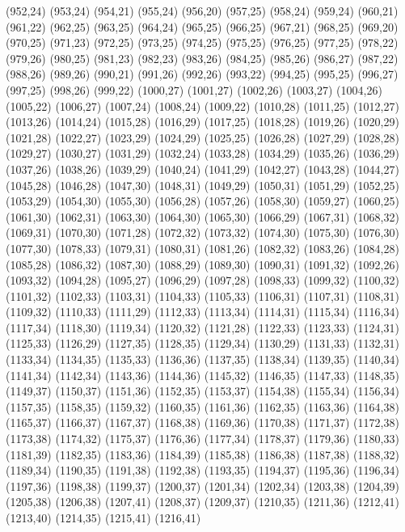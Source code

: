 (952,24)
(953,24)
(954,21)
(955,24)
(956,20)
(957,25)
(958,24)
(959,24)
(960,21)
(961,22)
(962,25)
(963,25)
(964,24)
(965,25)
(966,25)
(967,21)
(968,25)
(969,20)
(970,25)
(971,23)
(972,25)
(973,25)
(974,25)
(975,25)
(976,25)
(977,25)
(978,22)
(979,26)
(980,25)
(981,23)
(982,23)
(983,26)
(984,25)
(985,26)
(986,27)
(987,22)
(988,26)
(989,26)
(990,21)
(991,26)
(992,26)
(993,22)
(994,25)
(995,25)
(996,27)
(997,25)
(998,26)
(999,22)
(1000,27)
(1001,27)
(1002,26)
(1003,27)
(1004,26)
(1005,22)
(1006,27)
(1007,24)
(1008,24)
(1009,22)
(1010,28)
(1011,25)
(1012,27)
(1013,26)
(1014,24)
(1015,28)
(1016,29)
(1017,25)
(1018,28)
(1019,26)
(1020,29)
(1021,28)
(1022,27)
(1023,29)
(1024,29)
(1025,25)
(1026,28)
(1027,29)
(1028,28)
(1029,27)
(1030,27)
(1031,29)
(1032,24)
(1033,28)
(1034,29)
(1035,26)
(1036,29)
(1037,26)
(1038,26)
(1039,29)
(1040,24)
(1041,29)
(1042,27)
(1043,28)
(1044,27)
(1045,28)
(1046,28)
(1047,30)
(1048,31)
(1049,29)
(1050,31)
(1051,29)
(1052,25)
(1053,29)
(1054,30)
(1055,30)
(1056,28)
(1057,26)
(1058,30)
(1059,27)
(1060,25)
(1061,30)
(1062,31)
(1063,30)
(1064,30)
(1065,30)
(1066,29)
(1067,31)
(1068,32)
(1069,31)
(1070,30)
(1071,28)
(1072,32)
(1073,32)
(1074,30)
(1075,30)
(1076,30)
(1077,30)
(1078,33)
(1079,31)
(1080,31)
(1081,26)
(1082,32)
(1083,26)
(1084,28)
(1085,28)
(1086,32)
(1087,30)
(1088,29)
(1089,30)
(1090,31)
(1091,32)
(1092,26)
(1093,32)
(1094,28)
(1095,27)
(1096,29)
(1097,28)
(1098,33)
(1099,32)
(1100,32)
(1101,32)
(1102,33)
(1103,31)
(1104,33)
(1105,33)
(1106,31)
(1107,31)
(1108,31)
(1109,32)
(1110,33)
(1111,29)
(1112,33)
(1113,34)
(1114,31)
(1115,34)
(1116,34)
(1117,34)
(1118,30)
(1119,34)
(1120,32)
(1121,28)
(1122,33)
(1123,33)
(1124,31)
(1125,33)
(1126,29)
(1127,35)
(1128,35)
(1129,34)
(1130,29)
(1131,33)
(1132,31)
(1133,34)
(1134,35)
(1135,33)
(1136,36)
(1137,35)
(1138,34)
(1139,35)
(1140,34)
(1141,34)
(1142,34)
(1143,36)
(1144,36)
(1145,32)
(1146,35)
(1147,33)
(1148,35)
(1149,37)
(1150,37)
(1151,36)
(1152,35)
(1153,37)
(1154,38)
(1155,34)
(1156,34)
(1157,35)
(1158,35)
(1159,32)
(1160,35)
(1161,36)
(1162,35)
(1163,36)
(1164,38)
(1165,37)
(1166,37)
(1167,37)
(1168,38)
(1169,36)
(1170,38)
(1171,37)
(1172,38)
(1173,38)
(1174,32)
(1175,37)
(1176,36)
(1177,34)
(1178,37)
(1179,36)
(1180,33)
(1181,39)
(1182,35)
(1183,36)
(1184,39)
(1185,38)
(1186,38)
(1187,38)
(1188,32)
(1189,34)
(1190,35)
(1191,38)
(1192,38)
(1193,35)
(1194,37)
(1195,36)
(1196,34)
(1197,36)
(1198,38)
(1199,37)
(1200,37)
(1201,34)
(1202,34)
(1203,38)
(1204,39)
(1205,38)
(1206,38)
(1207,41)
(1208,37)
(1209,37)
(1210,35)
(1211,36)
(1212,41)
(1213,40)
(1214,35)
(1215,41)
(1216,41)

